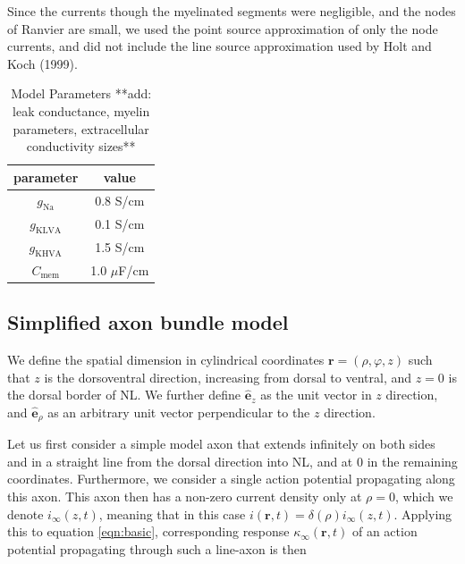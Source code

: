\documentclass[]{article}
\begin{document}
Since the currents though the myelinated segments were negligible, and
the nodes of Ranvier are small, we used the point source approximation
of only the node currents, and did not include the line source
approximation used by Holt and Koch (1999).

\begin{table}[h]
  \begin{centering}
    \begin{tabular}{|c|c|}
      \hline 
      parameter & value\tabularnewline
      \hline 
      \hline 
      $g_{\text{Na}}$ & 0.8 S/cm\texttwosuperior{}\tabularnewline
      \hline 
      $g_{\text{KLVA}}$ & 0.1 S/cm\texttwosuperior{}\tabularnewline
      \hline 
      $g_{\text{KHVA}}$ & 1.5 S/cm\texttwosuperior{}\tabularnewline
      \hline 
      $C_{\text{mem}}$ & 1.0 $\mu$F/cm\texttwosuperior{}\tabularnewline
      \hline 
    \end{tabular}
    \par
  \end{centering}
  \caption{Model Parameters **add: leak conductance, myelin parameters, extracellular conductivity sizes**}
  \label{tab:modparam}
\end{table}

\subsection{Simplified axon bundle
model}\label{simplified-axon-bundle-model}

\label{sec:efpresp}

We define the spatial dimension in cylindrical coordinates
\(\mathbf{r}=(\rho,\varphi,z)\) such that \(z\) is the dorsoventral
direction, increasing from dorsal to ventral, and \(z=0\) is the dorsal
border of NL. We further define \(\hat{\mathbf{e}}_{z}\) as the unit
vector in \(z\) direction, and \(\hat{\mathbf{e}}_{\rho}\) as an
arbitrary unit vector perpendicular to the \(z\) direction.

Let us first consider a simple model axon that extends infinitely on
both sides and in a straight line from the dorsal direction into NL, and
at 0 in the remaining coordinates. Furthermore, we consider a single
action potential propagating along this axon. This axon then has a
non-zero current density only at \(\rho=0\), which we denote
\(i_{\infty}(z,t)\), meaning that in this case
\(i(\mathbf{r},t)=\delta(\rho)i_{\infty}(z,t)\). Applying this to
equation \ref{eqn:basic}, corresponding response
\(\kappa_{\infty}(\mathbf{r},t)\) of an action potential propagating
through such a line-axon is then
\end{document}
